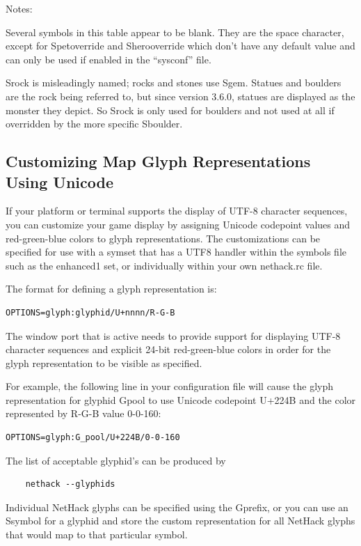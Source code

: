 \documentclass[titlepage]{article}
\begin{document}
Notes:

Several symbols in this table appear to be blank.
They are the space character, except for S\textunderscore pet\textunderscore override
and S\textunderscore hero\textunderscore override which don't have any default value
and can only be used if enabled in the ``sysconf'' file.

S\textunderscore rock is misleadingly named; rocks and stones use S\textunderscore gem.
Statues and boulders are the rock being referred to, but since
version 3.6.0, statues are displayed as the monster they depict.
So S\textunderscore rock is only used for boulders and not used at all if
overridden by the more specific S\textunderscore boulder.

\subsection*{Customizing Map Glyph Representations Using Unicode}

If your platform or terminal supports the display of UTF-8 character
sequences, you can customize your game display by assigning Unicode
codepoint values and red-green-blue colors to glyph
representations. The customizations can be specified for use with a symset that
has a UTF8 handler within the symbols file such as the enhanced1 set, or
individually within your own nethack.rc file.

The format for defining a glyph representation is:\\
\begin{verbatim}
OPTIONS=glyph:glyphid/U+nnnn/R-G-B
\end{verbatim}

The window port that is active needs to provide support for displaying UTF-8
character sequences and explicit 24-bit red-green-blue colors in order for the glyph
representation to be visible as specified.

For example, the following line in your configuration file will cause
the glyph representation for glyphid G\textunderscore pool to use Unicode codepoint
U+224B and the color represented by R-G-B value 0-0-160:\\
\begin{verbatim}
OPTIONS=glyph:G_pool/U+224B/0-0-160
\end{verbatim}

The list of acceptable glyphid's can be produced by 
\begin{verbatim}
    nethack --glyphids
\end{verbatim}
Individual NetHack glyphs can be specified using the G\textunderscore prefix,
or you can use an S\textunderscore symbol for a glyphid and store the custom
representation for all NetHack glyphs that would map to that
particular symbol.
\end{document}
